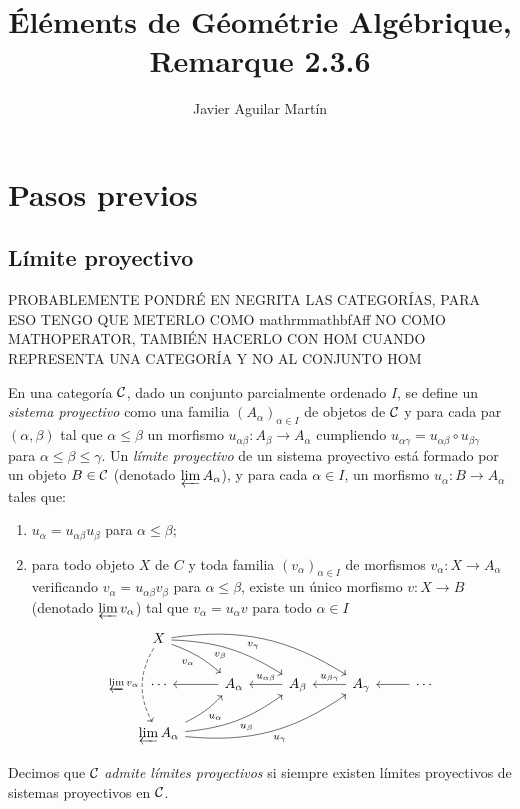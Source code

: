 \documentclass[twoside]{article}
\begin{document}
\title{Éléments de Géométrie Algébrique, Remarque 2.3.6}
\author{Javier Aguilar Martín}
\maketitle

\section{Pasos previos}

\subsection{Límite proyectivo}

PROBABLEMENTE PONDRÉ EN NEGRITA LAS CATEGORÍAS, PARA ESO TENGO QUE METERLO COMO mathrm{mathbf{Aff}} NO COMO MATHOPERATOR, TAMBIÉN HACERLO CON HOM CUANDO REPRESENTA UNA CATEGORÍA Y NO AL CONJUNTO HOM
\begin{defi}[EGA, 0-1.1.9]
En una categoría ${\mathcal C}$, dado un conjunto parcialmente ordenado $I$, se define un \emph{sistema proyectivo} como una familia $(A_\alpha)_{\alpha\in I}$ de objetos de ${\mathcal C}$ y para cada par $(\alpha,\beta)$ tal que $\alpha\leq\beta$ un morfismo $u_{\alpha\beta}:A_\beta\to A_\alpha$ cumpliendo $u_{\alpha\gamma}=u_{\alpha\beta}\circ u_{\beta\gamma}$ para $\alpha\leq\beta\leq\gamma$. Un \emph{límite proyectivo} de un sistema proyectivo está formado por un objeto $B\in{\mathcal C}$ (denotado $\varprojlim A_\alpha$), y para cada $\alpha\in I$, un morfismo $u_\alpha:B\to A_\alpha$ tales que: 
\begin{enumerate}
\item $u_\alpha=u_{\alpha\beta}u_{\beta}$ para $\alpha\leq\beta$;
\item para todo objeto $X$ de $C$ y toda familia $(v_\alpha)_{\alpha\in I}$ de morfismos $v_\alpha:X\to A_{\alpha}$ verificando $v_\alpha=u_{\alpha\beta}v_{\beta}$ para $\alpha\leq\beta$, existe un único morfismo $v:X\to B$ (denotado $\varprojlim v_\alpha$) tal que $v_\alpha=u_\alpha v$ para todo $\alpha\in I$
\[
\begin{tikzcd}
X\arrow[drrr, bend left=20, "v_\gamma"']\arrow[drr, bend left=15, "v_\beta"']\arrow[dr, bend left=10, "v_\alpha"']\arrow[dd, dashed, bend right, "\varprojlim v_\alpha"']& & & & \\
\cdots &A_\alpha\arrow[l]  & A_\beta\arrow[l, "u_{\alpha\beta}"']  & \arrow[l, "u_{\beta\gamma}"']A_\gamma &\cdots\arrow[l]\\
\varprojlim A_\alpha\arrow[urrr, bend left=-20, "u_\gamma"']\arrow[urr, bend left=-15, "u_\beta"']\arrow[ur, bend left=-10, "u_\alpha"']&  & & & 
\end{tikzcd}
\]
\end{enumerate}
Decimos que ${\mathcal C}$ \emph{admite límites proyectivos} si siempre existen límites proyectivos de sistemas proyectivos en ${\mathcal C}$. 
\end{defi}
\end{document}
